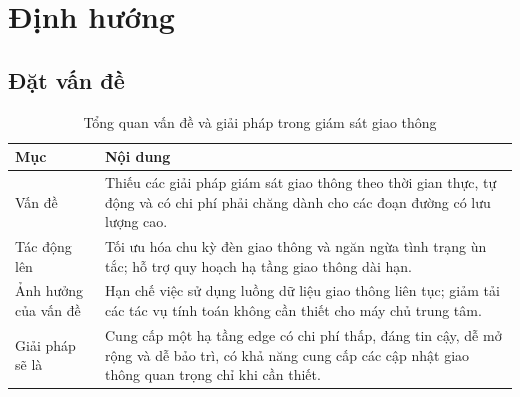 

\section{Định hướng}
\label{sec:vision}
\subsection{Đặt vấn đề}
\begin{table}[h!]
    \centering
    \begin{tabular}{|p{4cm}|p{10cm}|}
    \hline
    \textbf{Mục} & \textbf{Nội dung} \\
    \hline
    Vấn đề & Thiếu các giải pháp giám sát giao thông theo thời gian thực, tự động và có chi phí phải chăng dành cho các đoạn đường có lưu lượng cao. \\
    \hline
    Tác động lên & Tối ưu hóa chu kỳ đèn giao thông và ngăn ngừa tình trạng ùn tắc; hỗ trợ quy hoạch hạ tầng giao thông dài hạn. \\
    \hline
    Ảnh hưởng của vấn đề & Hạn chế việc sử dụng luồng dữ liệu giao thông liên tục; giảm tải các tác vụ tính toán không cần thiết cho máy chủ trung tâm. \\
    \hline
    Giải pháp sẽ là & Cung cấp một hạ tầng edge có chi phí thấp, đáng tin cậy, dễ mở rộng và dễ bảo trì, có khả năng cung cấp các cập nhật giao thông quan trọng chỉ khi cần thiết. \\
    \hline
    \end{tabular}
    \caption{Tổng quan vấn đề và giải pháp trong giám sát giao thông}
    \label{tab:traffic_solution}
\end{table}

